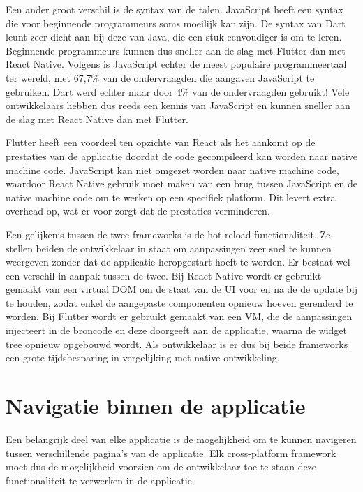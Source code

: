 Een ander groot verschil is de syntax van de talen. JavaScript heeft een syntax die voor beginnende programmeurs soms moeilijk kan zijn. De syntax van Dart leunt zeer dicht aan bij deze van Java, die een stuk eenvoudiger is om te leren. Beginnende programmeurs kunnen dus sneller aan de slag met Flutter dan met React Native. Volgens \textcite{Liu2020a} is JavaScript echter de meest populaire programmeertaal ter wereld, met 67,7\% van de ondervraagden die aangaven JavaScript te gebruiken. Dart werd echter maar door 4\% van de ondervraagden gebruikt! Vele ontwikkelaars hebben dus reeds een kennis van JavaScript en kunnen sneller aan de slag met React Native dan met Flutter.

Flutter heeft een voordeel ten opzichte van React als het aankomt op de prestaties  van de applicatie doordat de code gecompileerd kan worden naar native machine code. JavaScript kan niet omgezet worden naar native machine code, waardoor React Native gebruik moet maken van een brug tussen JavaScript en de native machine code om te werken op een specifiek platform. Dit levert extra overhead op, wat er voor zorgt dat de prestaties verminderen. 

Een gelijkenis tussen de twee frameworks is de hot reload functionaliteit. Ze stellen beiden de ontwikkelaar in staat om aanpassingen zeer snel te kunnen weergeven zonder dat de applicatie heropgestart hoeft te worden. Er bestaat wel een verschil in aanpak tussen de twee. Bij React Native wordt er gebruikt gemaakt van een virtual DOM om de staat van de UI voor en na de de update bij te houden, zodat enkel de aangepaste componenten opnieuw hoeven gerenderd te worden. Bij Flutter wordt er gebruikt gemaakt van een VM, die de aanpassingen injecteert in de broncode en deze doorgeeft aan de applicatie, waarna de widget tree opnieuw opgebouwd wordt. Als ontwikkelaar is er dus bij beide frameworks een grote tijdsbesparing in vergelijking met native ontwikkeling. 



\section{Navigatie binnen de applicatie}
\label{subsec:navigatieApplicatie}

Een belangrijk deel van elke applicatie is de mogelijkheid om te kunnen navigeren tussen verschillende pagina's van de applicatie. Elk cross-platform framework moet dus de mogelijkheid voorzien om de ontwikkelaar toe te staan deze functionaliteit te verwerken in de applicatie.

